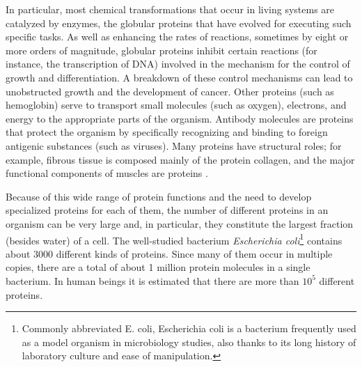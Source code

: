 In particular, most chemical transformations that occur in living systems are catalyzed by enzymes, the globular proteins that have evolved for executing such specific tasks. 
As well as enhancing the rates of reactions, sometimes by eight or more orders of magnitude, globular proteins inhibit certain reactions (for instance, the transcription of DNA) involved in the mechanism for the control of growth and differentiation. A breakdown of these control mechanisms can lead to unobstructed growth and the development of cancer. 
Other proteins (such as hemoglobin) serve to transport small molecules (such as oxygen), electrons, and energy to the appropriate parts of the organism. 
Antibody molecules are proteins that protect the organism by specifically recognizing and binding to foreign antigenic substances (such as viruses). 
Many proteins have structural roles; for example, fibrous tissue is composed mainly of the protein collagen, and the major functional components of muscles are proteins
\cite{brooks1988proteins}.

Because of this wide range of protein functions and the need to develop specialized proteins for each of them, the number of different proteins in an organism can be very large and, in particular, they constitute the largest fraction (besides water) of a cell. The well-studied bacterium \textit{Escherichia coli}\footnote{Commonly abbreviated E. coli, Escherichia coli is a bacterium frequently used as a model organism in microbiology studies, also thanks to its long history of laboratory culture and ease of manipulation.} contains about 3000 different kinds of proteins. Since many of them occur in multiple copies, there are a total of about 1 million protein molecules in a single bacterium. In human beings it is estimated that there are more than $10^5$ different proteins.

